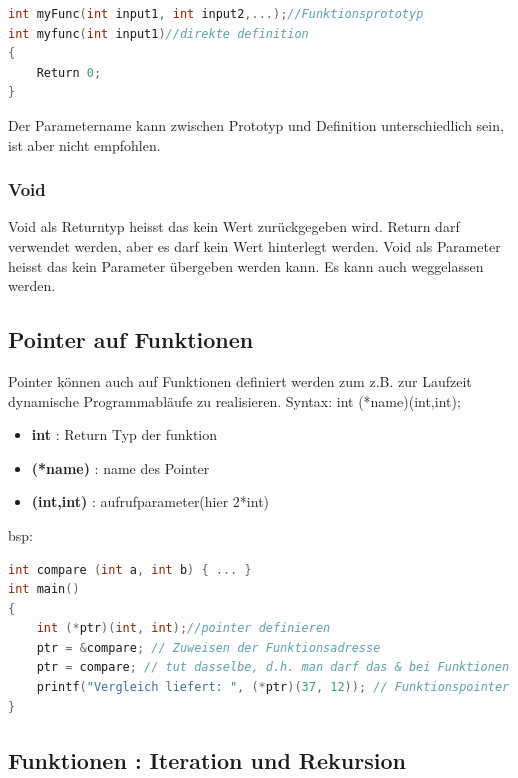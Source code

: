 \begin{lstlisting}[language = c]
int myFunc(int input1, int input2,...);//Funktionsprototyp
int myfunc(int input1)//direkte definition
{
    Return 0;
}
\end{lstlisting}
Der Parametername kann zwischen Prototyp und Definition unterschiedlich sein, ist aber nicht empfohlen.

\subsubsection{Void}

Void als Returntyp heisst das kein Wert zurückgegeben wird.\newline
Return darf verwendet werden, aber es darf kein Wert hinterlegt werden.\newline
Void als Parameter heisst das kein Parameter übergeben werden kann. Es kann auch weggelassen werden.

\subsection{Pointer auf Funktionen}

Pointer können auch auf Funktionen definiert werden zum z.B. zur Laufzeit dynamische Programmabläufe zu realisieren.\newline
Syntax: int (*name)(int,int);

\begin{itemize}[itemsep=1pt, parsep=0pt]
    \item \textbf{int} : Return Typ der funktion
    \item \textbf{(*name)} : name des Pointer
    \item \textbf{(int,int)} : aufrufparameter(hier 2*int)

\end{itemize}

bsp:

\begin{lstlisting}[language = c]
int compare (int a, int b) { ... }
int main() 
{
    int (*ptr)(int, int);//pointer definieren
    ptr = &compare; // Zuweisen der Funktionsadresse
    ptr = compare; // tut dasselbe, d.h. man darf das & bei Funktionen auch weglassen
    printf("Vergleich liefert: ", (*ptr)(37, 12)); // Funktionspointer wird dereferenziert
}
\end{lstlisting}

\subsection{Funktionen : Iteration und Rekursion}

